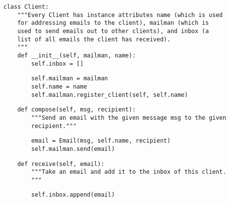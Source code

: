\pagebreak

\begin{lstlisting}
class Client:
    """Every Client has instance attributes name (which is used
    for addressing emails to the client), mailman (which is
    used to send emails out to other clients), and inbox (a
    list of all emails the client has received).
    """
    def __init__(self, mailman, name):
        self.inbox = []
\end{lstlisting}
\begin{solution}[1in]
\begin{lstlisting}
        self.mailman = mailman
        self.name = name
        self.mailman.register_client(self, self.name)
\end{lstlisting}
\end{solution}

\begin{lstlisting}
    def compose(self, msg, recipient):
        """Send an email with the given message msg to the given
        recipient."""
\end{lstlisting}
\begin{solution}[1in]
\begin{lstlisting}
        email = Email(msg, self.name, recipient)
        self.mailman.send(email)
\end{lstlisting}
\end{solution}

\begin{lstlisting}
    def receive(self, email):
        """Take an email and add it to the inbox of this client.
        """
\end{lstlisting}
\begin{solution}[1in]
\begin{lstlisting}
        self.inbox.append(email)
            
\end{lstlisting}
\end{solution}

\clearpage
